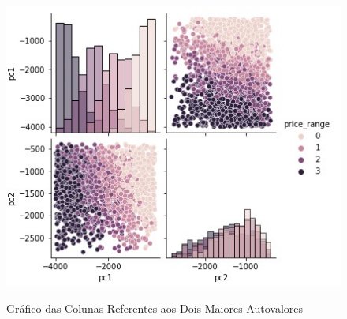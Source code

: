 \documentclass{report}
\begin{document}
\begin{figure}[htbp]
\centering
\caption{Gráfico das Colunas Referentes aos Dois Maiores Autovalores}
\includegraphics[width=12cm]{figures/plot_novo_dataset.jpg}
\label{figura com o gráfico das colunas referentes aos dois maiores autovalores}
\end{figure}
\end{document}
